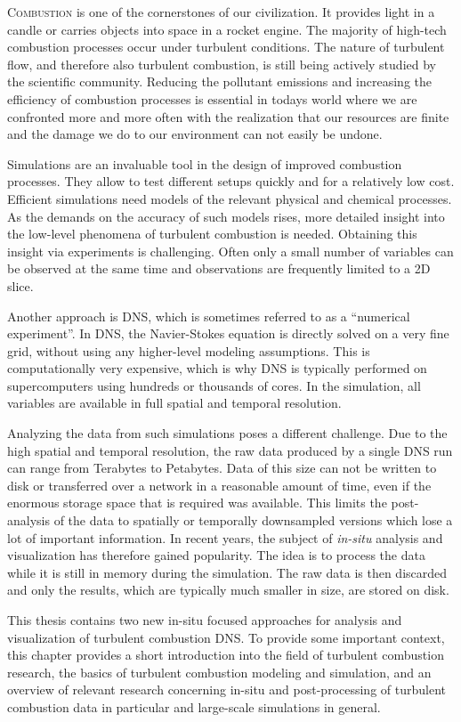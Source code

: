 \lettrine[lines=3, findent=-2pt, nindent=2pt, lhang=0.05]{C}{ombustion} is one
of the cornerstones of our civilization.
%
It provides light in a candle or carries objects into space in a rocket engine.
%
The majority of high-tech combustion processes occur under turbulent conditions.
%
The nature of turbulent flow, and therefore also turbulent combustion, is still
being actively studied by the scientific community.
%
Reducing the pollutant emissions and increasing the efficiency of combustion
processes is essential in todays world where we are confronted more and more
often with the realization that our resources are finite and the damage we do to
our environment can not easily be undone.
%

%
Simulations are an invaluable tool in the design of improved combustion
processes.
%
They allow to test different setups quickly and for a relatively low cost.
%
Efficient simulations need models of the relevant physical and chemical
processes.
%
As the demands on the accuracy of such models rises, more detailed insight into
the low-level phenomena of turbulent combustion is needed.
%
Obtaining this insight via experiments is challenging.
%
Often only a small number of variables can be observed at the same time and
observations are frequently limited to a \ac{2D} slice.
%

%
Another approach is \acf{DNS}, which is sometimes referred to as a ``numerical
experiment''.
%
In \ac{DNS}, the Navier-Stokes equation is directly solved on a very fine grid,
without using any higher-level modeling assumptions.
%
This is computationally very expensive, which is why \ac{DNS} is typically
performed on supercomputers using hundreds or thousands of cores.
%
In the simulation, all variables are available in full spatial and temporal
resolution.
%

%
Analyzing the data from such simulations poses a different challenge.
%
Due to the high spatial and temporal resolution, the raw data produced by a
single \ac{DNS} run can range from Terabytes to Petabytes.
%
Data of this size can not be written to disk or transferred over a network in a
reasonable amount of time, even if the enormous storage space that is required
was available.
%
This limits the post-analysis of the data to spatially or temporally downsampled
versions which lose a lot of important information.
%
In recent years, the subject of \emph{in-situ} analysis and visualization has
therefore gained popularity.
%
The idea is to process the data while it is still in memory during the
simulation.
%
The raw data is then discarded and only the results, which are typically much
smaller in size, are stored on disk.
%

%
This thesis contains two new in-situ focused approaches for analysis and
visualization of turbulent combustion \ac{DNS}.
%
To provide some important context, this chapter provides a short introduction
into the field of turbulent combustion research, the basics of turbulent
combustion modeling and simulation, and an overview of relevant research
concerning in-situ and post-processing of turbulent combustion data in
particular and large-scale simulations in general.
%